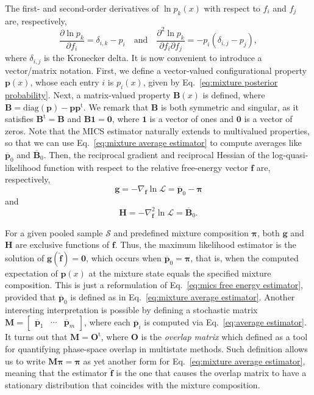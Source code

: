 \documentclass[journal=jctcce,manuscript=article,layout=twocolumn]{achemso}
\newcommand{\mt}[1]{\boldsymbol{\mathbf{#1}}}   %
\newcommand{\vt}[1]{\boldsymbol{\mathbf{#1}}}   %
\newcommand{\tr}[1]{#1^\text{t}}                %
\newcommand{\avg}[1]{\overline{#1}}             %
\begin{document}
The first- and second-order derivatives of $\ln p_k(x)$ with respect to $f_i$ and $f_j$ are, respectively,
\begin{equation*}
\frac{\partial \ln p_k}{\partial f_i} = \delta_{i,k} - p_i
\quad \text{and} \quad
\frac{\partial^2\ln p_k}{\partial f_i \partial f_j} = -p_i(\delta_{i,j} - p_j),
\end{equation*}
where $\delta_{i,j}$ is the Kronecker delta. It is now convenient to introduce a vector/matrix notation. First, we define a vector-valued configurational property $\vt p(x)$, whose each entry $i$ is $p_i(x)$, given by Eq.~\eqref{eq:mixture posterior probability}. Next, a matrix-valued property $\mt B(x)$ is defined, where $\mt B = \text{diag}(\vt p) - {\vt p}\tr{\vt p}$. We remark that $\mt B$ is both symmetric and singular, as it satisfies $\tr{\mt B} = \mt B$ and $\mt B\vt 1 = \vt 0$, where $\vt 1$ is a vector of ones and $\vt 0$ is a vector of zeros. Note that the MICS estimator naturally extends to multivalued properties, so that we can use Eq.~\eqref{eq:mixture average estimator} to compute averages like $\avg{\vt p}_0$ and $\avg{\mt B}_0$. Then, the reciprocal gradient and reciprocal Hessian of the log-quasi-likelihood function with respect to the relative free-energy vector $\vt f$ are, respectively,
\begin{equation}
\label{eq:mics score vector}
\vt g = -\nabla_{\vt f} \ln \mathcal L = \avg{\vt p}_0 - \vt \pi
\end{equation}
and
\begin{equation}
\label{eq:mics fisher information matrix}
\mt H = -\nabla^2_{\vt f} \ln \mathcal L = \avg{\mt B}_0.
\end{equation}

For a given pooled sample $\mathcal S$ and predefined mixture composition $\vt \pi$, both $\vt g$ and $\mt H$ are exclusive functions of $\vt f$. Thus, the maximum likelihood estimator is the solution of $\vt g(\hat{\vt f}) = \vt 0$, which occurs when $\avg{\vt p}_0 = \vt \pi$, that is, when the computed expectation of $\vt p(x)$ at the mixture state equals the specified mixture composition. This is just a reformulation of Eq.~\eqref{eq:mics free energy estimator}, provided that $\avg{\vt p}_0$ is defined as in Eq.~\eqref{eq:mixture average estimator}. Another interesting interpretation is possible by defining a stochastic matrix $\mt M = [\begin{array}{ccc} \avg{\vt p}_1 & \cdots & \avg{\vt p}_m \end{array}]$, where each $\avg{\vt p}_i$ is computed via Eq.~\eqref{eq:average estimator}. It turns out that $\mt M = \tr{\mt O}$, where $\mt O$ is the \textit{overlap matrix} which \citeauthor{Klimovich_2015} \cite{Klimovich_2015} defined as a tool for quantifying phase-space overlap in multistate methods. Such definition allows us to write $\mt M \vt \pi = \vt \pi$ as yet another form for Eq.~\eqref{eq:mixture average estimator}, meaning that the estimator $\hat{\vt f}$ is the one that causes the overlap matrix to have a stationary distribution that coincides with the mixture composition.
\end{document}
